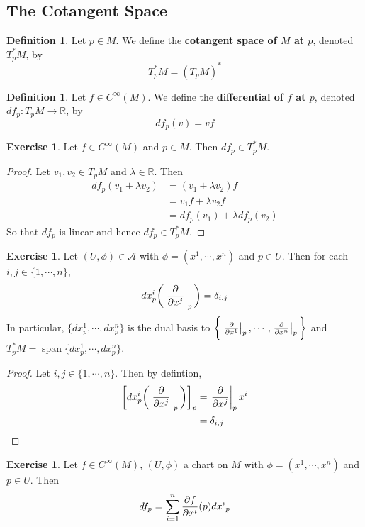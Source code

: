 \documentclass[12pt]{amsart}
\theoremstyle{definition}
\newtheorem{defn}[definition]{Definition}
\newtheorem{ex}[definition]{Exercise}
\newcommand{\del}{\delta}
\newcommand{\lam}{\lambda}
\newcommand{\R}{\mathbb{R}}
\newcommand{\MA}{\mathcal{A}}
\DeclareMathOperator{\spn}{span}
\begin{document}
	\subsection{The Cotangent Space}	
	
	
	\begin{defn}
	Let $p \in M$. We define the \textbf{cotangent space of $M$ at $p$}, denoted $T^*_pM$, by $$T^*_pM = (T_pM)^*$$
	\end{defn}
	
	\begin{defn}
	Let $f \in C^{\infty}(M)$. We define the \textbf{differential of $f$ at $p$}, denoted $df_p:T_pM \rightarrow \R$, by $$df_p(v) = vf$$
	\end{defn}
	
	\begin{ex}
	Let $f \in C^{\infty}(M)$ and $p \in M$. Then $df_p \in T^*_pM$.
	\end{ex}
	
	\begin{proof}
	Let $v_1, v_2 \in T_pM$ and $\lam \in \R$. Then 
	\begin{align*}
	df_p(v_1 + \lam v_2) 
	&= (v_1 + \lam v_2) f \\
	&= v_1 f + \lam v_2 f \\
	&= df_p(v_1) + \lam df_p(v_2)
	\end{align*}
	So that $df_p$ is linear and hence $df_p \in T^*_pM$.
	\end{proof}
	
	\begin{ex}
		Let $(U, \phi) \in \MA$ with $\phi = (x^1, \cdots, x^n)$ and $p \in U$. Then for each $i,j \in \{1, \cdots, n\}$, $$dx^i_p \bigg(\eval{\pdv{x^j}}_p \bigg) = \del_{i,j}$$ 
		In particular, $\{dx^1_p, \cdots, dx^n_p \}$ is the dual basis to $\bigg \{ \eval{\pdv{x^1}}_{p}, \cdots, \eval{\pdv{x^n}}_{p} \bigg \}$ and $T_p^*M = \spn\{dx^1_p, \cdots, dx^n_p\}$.
	\end{ex}

	\begin{proof}
		Let $i,j \in \{1, \cdots, n\}$. Then  by defintion,
		\begin{align*}
			\bigg[ dx^i_p \bigg (\eval{\pdv{x^j}}_{p} \bigg ) \bigg]_p 
			&= \eval{\pdv{x^j}}_{p} x^i \\
			&= \del_{i,j} \\
		\end{align*}
	\end{proof}
	
	\begin{ex}
		Let $f \in C^{\infty}(M)$, $(U, \phi)$ a chart on $M$ with $\phi = (x^1, \cdots, x^n)$ and $p \in U$. Then $$df_p = \sum_{i=1}^n {\pdv{f}{x^i}}(p) {dx^i}_p$$
	\end{ex}
\end{document}
